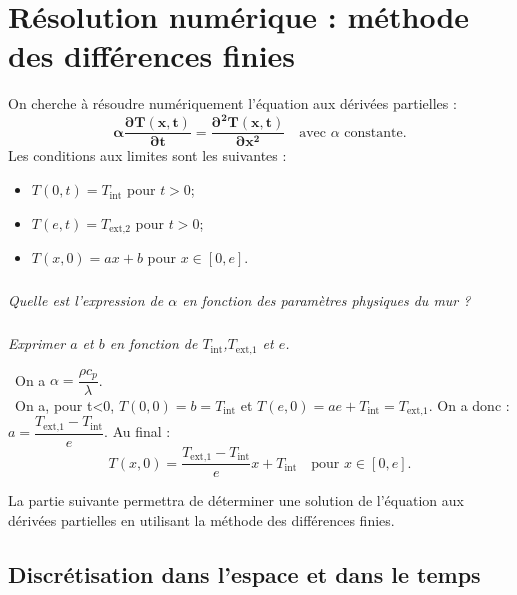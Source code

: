 \begin{corrige}
\begin{center}
\begin{tikzpicture}[scale = 0.15]
	\end{tikzpicture}
\end{center}

\end{corrige}
\else
\fi

\section{Résolution numérique : méthode des différences finies}

\ifprof
\else
On cherche à résoudre numériquement l'équation aux dérivées partielles : 
\begin{equation}
\mathbf{\alpha \dfrac{\partial T(x,t)}{\partial t} = \dfrac{\partial^2 T(x,t)}{\partial x^2}} \quad \text{avec }\alpha \text{ constante.}
\end{equation}
Les conditions aux limites sont les suivantes :
\begin{itemize}
\item $T(0,t)=T_{\text{int}}$ pour $t>0$;
\item $T(e,t)=T_{\text{ext,2}}$ pour $t>0$;
\item $T(x,0)=ax + b$ pour $x\in[0,e]$.
\end{itemize}

\subparagraph{}\textit{Quelle est l'expression de $\alpha$ en fonction des paramètres physiques du mur ?}


\subparagraph{\label{q_tini}}\textit{Exprimer $a$ et $b$ en fonction de $T_{\text{int}}$,$T_{\text{ext,1}}$ et $e$.}
\fi

\ifprof
\begin{corrige}
\question\
On a $\alpha =\dfrac{\rho c_p}{\lambda}$.\\

\question\
On a, pour t<0, $T(0,0)= b = T_{\text{int}}$ et  $T(e,0)= ae+ T_{\text{int}}= T_{\text{ext,1}}$. On a donc : $a= \dfrac{T_{\text{ext,1}}- T_{\text{int}}}{e}$. Au final :
$$T(x,0)=\dfrac{T_{\text{ext,1}}- T_{\text{int}}}{e} x + T_{\text{int}} \quad \text{pour } x\in[0,e].$$
\end{corrige}
\else
\vspace{.5cm}

La partie suivante permettra de déterminer une solution de l'équation aux dérivées partielles en utilisant la méthode des différences finies.

\fi

\subsection{Discrétisation dans l'espace et dans le temps}

